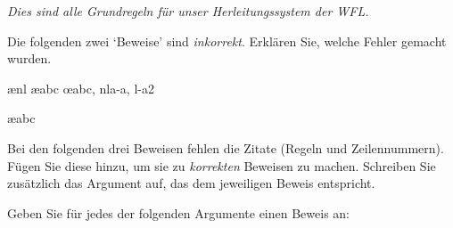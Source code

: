 \emph{Dies sind alle Grundregeln für unser Herleitungssystem der WFL.}

\practiceproblems

\problempart
Die folgenden zwei `Beweise' sind \emph{inkorrekt}. Erklären Sie, welche Fehler gemacht wurden.
\begin{fitchproof}
\open
{}
\ae{nl}
	\ae{abc}
\close
\open
\close
{}\oe{abc, nla-a, l-a2}
\end{fitchproof}

\begin{fitchproof}
\ae{abc}
\end{fitchproof}

\problempart
Bei den folgenden drei Beweisen fehlen die Zitate (Regeln und Zeilennummern). Fügen Sie diese hinzu, um sie zu \emph{korrekten} Beweisen zu machen. Schreiben Sie zusätzlich das Argument auf, das dem jeweiligen Beweis entspricht.

\begin{multicols}{2}
\begin{fitchproof}
\end{fitchproof}

\begin{fitchproof}
\open
\close
{}%
\end{fitchproof}

\begin{fitchproof}
\open
\close
\open
\close
{}%
\end{fitchproof}
\end{multicols}

\solutions
\problempart
\label{pr.solvedTFLproofs}
Geben Sie für jedes der folgenden Argumente einen Beweis an:

